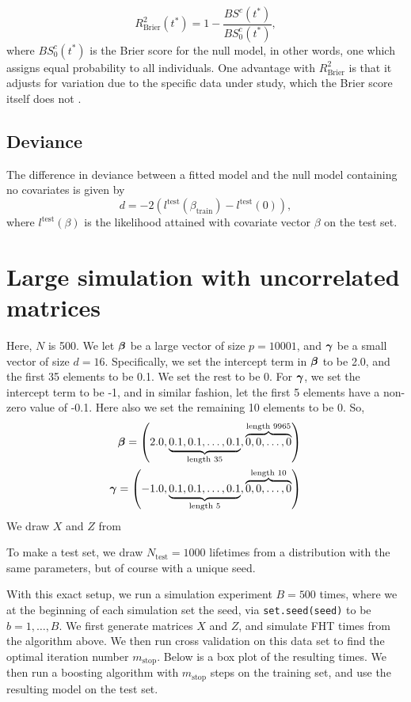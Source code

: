 \begin{equation*}
    R^2_{\text{Brier}}(t^*)=1-\frac{BS^c(t^*)}{BS^c_0(t^*)},
\end{equation*}
where $BS^c_0(t^*)$ is the Brier score for the null model, in other words, one which assigns equal probability to all individuals. One advantage with $R^2_{\text{Brier}}$ is that it adjusts for variation due to the specific data under study, which the Brier score itself does not \citep{bovelstadborgan}.

\subsection{Deviance}
The difference in deviance between a fitted model and the null model containing no covariates is given by
\begin{equation*}
    d=-2\left(l^{\text{test}}(\beta_{\text{train}})-l^{\text{test}}(0)\right),
\end{equation*}
where $l^{\text{test}}(\beta)$ is the likelihood attained with covariate vector $\beta$ on the test set.

\section{Large simulation with uncorrelated matrices}
Here, $N$ is 500. We let $\boldsymbol{\beta}$ be a large vector of size $p=10001$, and $\boldsymbol{\gamma}$ be a small vector of size $d=16$. Specifically, we set the intercept term in $\boldsymbol{\beta}$ to be 2.0, and the first 35 elements to be 0.1. We set the rest to be 0. For $\boldsymbol{\gamma}$, we set the intercept term to be -1, and in similar fashion, let the first 5 elements have a non-zero value of -0.1. Here also we set the remaining 10 elements to be 0. So,
\begin{align*}
    \boldsymbol{\beta}=\left(2.0, \underbrace{0.1, 0.1, \ldots, 0.1}_{\text{length 35}}, \overbrace{0, 0, \ldots, 0}^{\text{length 9965}}\right) \\
    \boldsymbol{\gamma}=\left(-1.0, \underbrace{0.1, 0.1, \ldots, 0.1}_{\text{length 5}}, \overbrace{0, 0, \ldots, 0}^{\text{length 10}}\right)
\end{align*}
We draw $X$ and $Z$ from 

To make a test set, we draw $N_{\text{test}}=1000$ lifetimes from a distribution with the same parameters, but of course with a unique seed.

With this exact setup, we run a simulation experiment $B=500$ times, where we at the beginning of each simulation set the seed, via \verb|set.seed(seed)| to be $b=1,\ldots,B$. We first generate matrices $X$ and $Z$, and simulate FHT times from the algorithm above. We then run cross validation on this data set to find the optimal iteration number $m_{\text{stop}}$. Below is a box plot of the resulting times. We then run a boosting algorithm with $m_{\text{stop}}$ steps on the training set, and use the resulting model on the test set.

